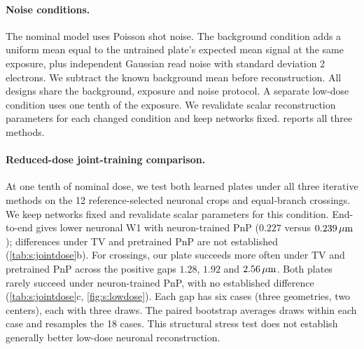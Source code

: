 \paragraph{Noise conditions.}
The nominal model uses Poisson shot noise. The background condition adds a uniform mean equal to the untrained plate's expected mean signal at the same exposure, plus independent Gaussian read noise with standard deviation 2 electrons. We subtract the known background mean before reconstruction. All designs share the background, exposure and noise protocol. A separate low-dose condition uses one tenth of the exposure. We revalidate scalar reconstruction parameters for each changed condition and keep networks fixed.  reports all three methods.

\begin{table}[t]
\centering\small
\widetab{}
\caption{Noise controls on 12 crops at $C=8$. Errors are in $\mu$m; changes and cell-bootstrap 95\,\% intervals compare our and untrained plates within the same condition.}
\label{tab:s:noise}
\end{table}

\paragraph{Reduced-dose joint-training comparison.}
At one tenth of nominal dose, we test both learned plates under all three iterative methods on the 12 reference-selected neuronal crops and equal-branch crossings. We keep networks fixed and revalidate scalar parameters for this condition. End-to-end gives lower neuronal W1 with neuron-trained PnP ($0.227$ versus $0.239\,\mu\mathrm{m}$); differences under TV and pretrained PnP are not established (\cref{tab:s:jointdose}b). For crossings, our plate succeeds more often under TV and pretrained PnP across the positive gaps $1.28$, $1.92$ and $2.56\,\mu\mathrm{m}$. Both plates rarely succeed under neuron-trained PnP, with no established difference (\cref{tab:s:jointdose}c, \cref{fig:s:lowdose}). Each gap has six cases (three geometries, two centers), each with three draws. The paired bootstrap averages draws within each case and resamples the 18 cases. This structural stress test does not establish generally better low-dose neuronal reconstruction.

